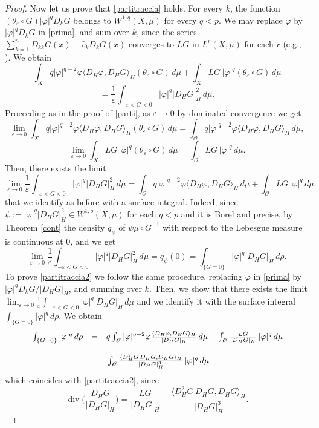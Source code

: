 \documentclass[reqno,twoside,12pt]{amsart}
\begin{document}
\begin{proof}
Now let us prove that   \eqref{partitraccia} holds. For every  $k$, the function  $( \theta_{\varepsilon}\circ G)| \varphi |^qD_kG$ belongs to  $W^{1,q} (X, \mu)$ for every $q<p$. We may replace  $\varphi$ by $  |\varphi|^qD_kG$ in \eqref{prima}, and sum over $k$, since the series  $ \sum_{k=1}^{n}  D_{kk}G(x) -  \hat{v}_kD_kG(x) $ converges to  $LG$ in  $L^r(X, \mu)$ for each $r$ (e.g., \cite[Prop. 5.8.8]{Boga}). We obtain
$$\int_X q|\varphi|^{q-2}\varphi  \langle D_H\varphi, D_HG\rangle_H  ( \theta_{\varepsilon}\circ G) \,d\mu + \int_X  LG \,|\varphi|^q  ( \theta_{\varepsilon}\circ G) \,d\mu $$
$$= \frac{1}{\varepsilon}  \int_{-{\varepsilon}<G <0}  |\varphi|^q |D_HG|_H^2  \,d\mu .$$
Proceeding as in the proof of  \eqref{parti}, as ${\varepsilon}\to 0$ by dominated convergence we get
$$\lim_{{\varepsilon} \to 0}  \int_X q|\varphi|^{q-2}\varphi  \langle D_H\varphi, D_HG\rangle_H  ( \theta_{\varepsilon}\circ G )\,d\mu  = 
  \int_{\mathcal O} q|\varphi|^{q-2}\varphi \langle D_H\varphi, D_HG\rangle_H  \,d\mu, $$
$$\lim_{{\varepsilon} \to 0}  \int_X LG \,|\varphi|^q (\theta_{\varepsilon}\circ G ) \,d\mu =    \int_{\mathcal O} LG \,|\varphi|^q    \,d\mu .$$
Then, there exists the limit
$$\lim_{{\varepsilon} \to 0}  \frac{1}{\varepsilon} \int_{ -{\varepsilon}<G<0} | \varphi|^q |D_HG|_H^2  \,d\mu =  \int_{\mathcal O} q|\varphi|^{q-2}\varphi  \langle D_H\varphi, D_HG\rangle_H  \,d\mu +  \int_{\mathcal O} LG \,|\varphi|^q   \,d\mu $$
that we identify as before with  a surface integral. Indeed,  since   $\psi:=| \varphi|^q  |D_HG|_H^2 \in W^{1,q} (X, \mu)$ for each  $q<p$ and it is Borel and precise, by Theorem \ref{cont} the density $q_{\psi}$ of $\psi \mu\circ G^{-1}$ with respect to the Lebesgue measure is continuous at $0$, and we get
$$\lim_{{\varepsilon} \to 0}  \frac{1}{\varepsilon} \int_{ -{\varepsilon}<G<0} | \varphi|^q |D_HG|_H^2  \,d\mu = q_{\psi}(0) = \int_{\{G=0\}} | \varphi|^q |D_HG|_H \,d\rho.$$
To prove \eqref{partitraccia2} we follow the same procedure, replacing   $\varphi $ in \eqref{prima} by $  |\varphi|^qD_kG/|D_HG|_H$,  and summing over  $k$. Then, we show that there exists the limit 
$\lim_{{\varepsilon} \to 0}  \frac{1}{\varepsilon} \int_{ -{\varepsilon}<G<0} | \varphi|^q |D_HG|_H   \,d\mu $ and we identify it with the surface integral $\int_{\{G=0\}} | \varphi|^q  \,d\rho$. We obtain
$$
\begin{array}{lll}
{\displaystyle}  \int_{\{G=0\}} | \varphi|^q   \,d\rho  &= & {\displaystyle}  q  \int_{\mathcal O}  | \varphi|^{q-2}\varphi \frac{\langle D_H\varphi, D_HG\rangle_H }{|D_HG|_H }  \,d\mu +  \int_{\mathcal O} \frac{LG}{|D_HG|_H } \,| \varphi|^q \,d\mu 
\\
\\
& -  &{\displaystyle}  \int_{\mathcal O} \frac{\langle D^2_HG\, D_HG, D_HG\rangle_H}{|D_HG|_H^3 } \,| \varphi|^q \,d\mu 
\end{array}
$$
which coincides with \eqref{partitraccia2}, since 
$${\operatorname{div}} \bigg( \frac{D_HG}{|D_HG|_H} \bigg) = \frac{LG}{|D_HG|_H} - \frac{\langle D^2_HG\, D_HG, D_HG\rangle_H}{|D_HG|_H^3}.$$
\end{proof}
 
\end{document}
